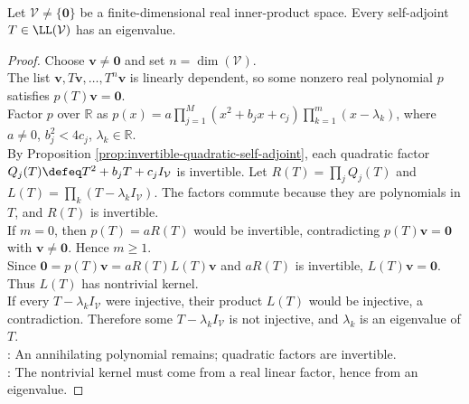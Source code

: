 \begin{lemma} \label{lem:self-adjoint-operators-have-eigenvalues} \\
Let $\mathcal{V}\neq\{\mathbf{0}\}$ be a finite-dimensional real inner-product space. Every self-adjoint $T\in\LL(\mathcal{V})$ has an eigenvalue.
\begin{proof}
Choose $\mathbf{v}\neq\mathbf{0}$ and set $n=\dim(\mathcal{V})$.\\
The list $\mathbf{v},T\mathbf{v},\ldots,T^n\mathbf{v}$ is linearly dependent, so some nonzero real polynomial $p$ satisfies $p(T)\mathbf{v}=\mathbf{0}$.\\
Factor $p$ over $\mathbb{R}$ as $p(x)=a\prod\limits_{j=1}^{M}(x^2+b_jx+c_j)\prod\limits_{k=1}^{m}(x-\lambda_k)$, where $a\neq0$, $b_j^2<4c_j$, $\lambda_k\in\mathbb{R}$.\\
By Proposition \ref{prop:invertible-quadratic-self-adjoint}, each quadratic factor
$Q_j(T)\defeq T^2+b_jT+c_jI_{\mathcal{V}}$ is invertible. Let
$R(T)=\prod_j Q_j(T)$ and $L(T)=\prod_k(T-\lambda_kI_{\mathcal{V}})$. The factors commute because they are polynomials in $T$, and $R(T)$ is invertible.\\
If $m=0$, then $p(T)=aR(T)$ would be invertible, contradicting $p(T)\mathbf{v}=\mathbf{0}$ with $\mathbf{v}\neq\mathbf{0}$. Hence $m\geq1$.\\
Since $\mathbf{0}=p(T)\mathbf{v}=aR(T)L(T)\mathbf{v}$ and $aR(T)$ is invertible, $L(T)\mathbf{v}=\mathbf{0}$. Thus $L(T)$ has nontrivial kernel.\\
If every $T-\lambda_kI_{\mathcal{V}}$ were injective, their product $L(T)$ would be injective, a contradiction. Therefore some $T-\lambda_kI_{\mathcal{V}}$ is not injective, and $\lambda_k$ is an eigenvalue of $T$.\\
: An annihilating polynomial remains; quadratic factors are invertible.\\
: The nontrivial kernel must come from a real linear factor, hence from an eigenvalue.
\end{proof}
\end{lemma}

